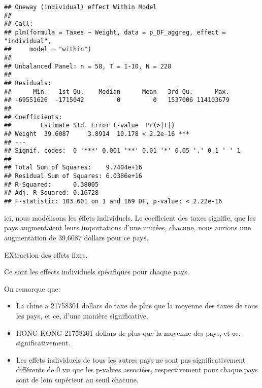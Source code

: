 \documentclass[
]{book}
\providecommand{\tightlist}{%
  \setlength{\itemsep}{0pt}\setlength{\parskip}{0pt}}
\begin{document}
\begin{verbatim}
## Oneway (individual) effect Within Model
## 
## Call:
## plm(formula = Taxes ~ Weight, data = p_DF_aggreg, effect = "individual", 
##     model = "within")
## 
## Unbalanced Panel: n = 58, T = 1-10, N = 228
## 
## Residuals:
##      Min.   1st Qu.    Median      Mean   3rd Qu.      Max. 
## -69551626  -1715042         0         0   1537006 114103679 
## 
## Coefficients:
##        Estimate Std. Error t-value  Pr(>|t|)    
## Weight  39.6087     3.8914  10.178 < 2.2e-16 ***
## ---
## Signif. codes:  0 '***' 0.001 '**' 0.01 '*' 0.05 '.' 0.1 ' ' 1
## 
## Total Sum of Squares:    9.7404e+16
## Residual Sum of Squares: 6.0386e+16
## R-Squared:      0.38005
## Adj. R-Squared: 0.16728
## F-statistic: 103.601 on 1 and 169 DF, p-value: < 2.22e-16
\end{verbatim}

ici, nous modélisons les éffets individuels.
Le coefficient des taxes signifie, que les pays augmentaient leurs importations d'une unitées, chacune, nous aurions une augmentation de 39,6087 dollars pour ce pays.

EXtraction des effets fixes.

Ce sont les effects individuels spécifiques pour chaque pays.

On remarque que:

\begin{itemize}
\tightlist
\item
  La chine a 21758301 dollars de taxe de plus que la moyenne des taxes de tous les pays, et ce, d'une manière significative.
\item
  HONG KONG 21758301 dollars de plus que la moyenne des pays, et ce, significativement.
\item
  Les effets individuels de tous les autres pays ne sont pas significativement différents de 0 vu que les p-values associées, respectivement pour chaque pays sont de loin supérieur au seuil chacune.
\end{itemize}
\end{document}
